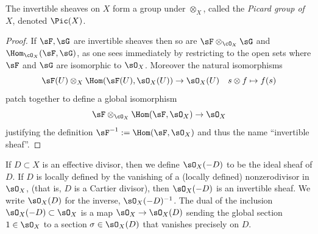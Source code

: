\begin{proposition}
 The invertible sheaves on $X$ form a group under $\otimes_{X}$, called the 
\emph{Picard group of $X$}, denoted $\Pic(X)$. 
\end{proposition}
\begin{proof}
 If $\sF, \sG$ are invertible sheaves then so are $\sF\otimes_{\cO_X}\sG$ and  $\Hom_{\cO_X}(\sF, \sG)$, as one sees immediately by
restricting to the open sets where $\sF$ and $\sG$ are isomorphic to $\sO_{X}$. Moreover the natural isomorphisms
$$
\sF(U) \otimes_{X} \Hom(\sF(U), \sO_{X}(U)) \to \sO_{X}(U)\quad s \otimes f \mapsto f(s)
$$ 
patch together to define a global isomorphism 
$$
\sF \otimes_{\cO_X} \Hom(\sF, \sO_{X}) \to \sO_{X}
$$
justifying the definition
$\sF^{-1} := \Hom(\sF, \sO_{X})$ and thus the name ``invertible sheaf''. 
\end{proof}
 
If $D\subset X$ is an effective divisor, then we define $\sO_{X}(-D)$ to be the ideal sheaf of $D$. If $D$ is locally defined by the vanishing of a (locally defined) nonzerodivisor in $\sO_{X}$, (that is, $D$ is a Cartier divisor), then
$\sO_{X}(-D)$ is an invertible
sheaf.
We write $\sO_{X}(D)$ for the inverse, $\sO_{X}(-D)^{-1}$. The dual of the inclusion
$\sO_{X}(-D)\subset \sO_{X}$ is a map $\sO_{X} \to \sO_{X}(D)$ sending the global section $1\in \sO_{X}$ to a section
$\sigma\in \sO_{X}(D)$ that vanishes precisely on $D$.

